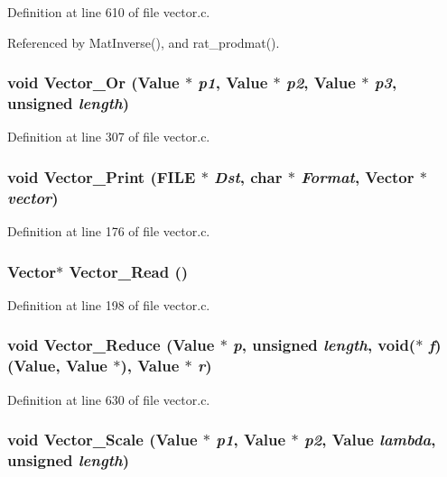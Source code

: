 Definition at line 610 of file vector.c.

Referenced by Mat\-Inverse(), and rat\_\-prodmat().

\subsubsection{\setlength{\rightskip}{0pt plus 5cm}void Vector\_\-Or (Value $\ast$ {\em p1}, Value $\ast$ {\em p2}, Value $\ast$ {\em p3}, unsigned {\em length})}\label{vector_8c_a14}




Definition at line 307 of file vector.c.
\subsubsection{\setlength{\rightskip}{0pt plus 5cm}void Vector\_\-Print (FILE $\ast$ {\em Dst}, char $\ast$ {\em Format}, Vector $\ast$ {\em vector})}\label{vector_8c_a7}




Definition at line 176 of file vector.c.
\subsubsection{\setlength{\rightskip}{0pt plus 5cm}Vector$\ast$ Vector\_\-Read ()}\label{vector_8c_a8}




Definition at line 198 of file vector.c.
\subsubsection{\setlength{\rightskip}{0pt plus 5cm}void Vector\_\-Reduce (Value $\ast$ {\em p}, unsigned {\em length}, void($\ast$ {\em f})(Value, Value $\ast$), Value $\ast$ {\em r})}\label{vector_8c_a27}




Definition at line 630 of file vector.c.
\subsubsection{\setlength{\rightskip}{0pt plus 5cm}void Vector\_\-Scale (Value $\ast$ {\em p1}, Value $\ast$ {\em p2}, Value {\em lambda}, unsigned {\em length})}\label{vector_8c_a15}




